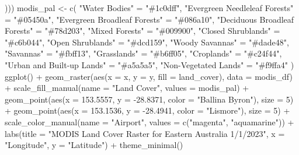 \documentclass[
  12pt,
  letterpaper,
  DIV=11,
  numbers=noendperiod]{scrartcl}
\newenvironment{Shaded}{\begin{snugshade}}{\end{snugshade}}
\newcommand{\AttributeTok}[1]{\textcolor[rgb]{0.40,0.45,0.13}{#1}}
\newcommand{\DecValTok}[1]{\textcolor[rgb]{0.68,0.00,0.00}{#1}}
\newcommand{\FloatTok}[1]{\textcolor[rgb]{0.68,0.00,0.00}{#1}}
\newcommand{\FunctionTok}[1]{\textcolor[rgb]{0.28,0.35,0.67}{#1}}
\newcommand{\NormalTok}[1]{\textcolor[rgb]{0.00,0.23,0.31}{#1}}
\newcommand{\OtherTok}[1]{\textcolor[rgb]{0.00,0.23,0.31}{#1}}
\newcommand{\SpecialCharTok}[1]{\textcolor[rgb]{0.37,0.37,0.37}{#1}}
\newcommand{\StringTok}[1]{\textcolor[rgb]{0.13,0.47,0.30}{#1}}
\begin{document}
\begin{Shaded}
\begin{Highlighting}[]
\NormalTok{  )))}
\NormalTok{modis\_pal }\OtherTok{\textless{}{-}} \FunctionTok{c}\NormalTok{(}
  \StringTok{"Water Bodies"} \OtherTok{=} \StringTok{"\#1c0dff"}\NormalTok{,}
  \StringTok{"Evergreen Needleleaf Forests"} \OtherTok{=} \StringTok{"\#05450a"}\NormalTok{,}
  \StringTok{"Evergreen Broadleaf Forests"} \OtherTok{=} \StringTok{"\#086a10"}\NormalTok{,}
  \StringTok{"Deciduous Broadleaf Forests"} \OtherTok{=} \StringTok{"\#78d203"}\NormalTok{,}
  \StringTok{"Mixed Forests"} \OtherTok{=} \StringTok{"\#009900"}\NormalTok{,}
  \StringTok{"Closed Shrublands"} \OtherTok{=} \StringTok{"\#c6b044"}\NormalTok{,}
  \StringTok{"Open Shrublands"} \OtherTok{=} \StringTok{"\#dcd159"}\NormalTok{,}
  \StringTok{"Woody Savannas"} \OtherTok{=} \StringTok{"\#dade48"}\NormalTok{,}
  \StringTok{"Savannas"} \OtherTok{=} \StringTok{"\#fbff13"}\NormalTok{,}
  \StringTok{"Grasslands"} \OtherTok{=} \StringTok{"\#b6ff05"}\NormalTok{,}
  \StringTok{"Croplands"} \OtherTok{=} \StringTok{"\#c24f44"}\NormalTok{,}
  \StringTok{"Urban and Built{-}up Lands"} \OtherTok{=} \StringTok{"\#a5a5a5"}\NormalTok{,}
  \StringTok{"Non{-}Vegetated Lands"} \OtherTok{=} \StringTok{"\#f9ffa4"}
\NormalTok{)}
\FunctionTok{ggplot}\NormalTok{() }\SpecialCharTok{+}
  \FunctionTok{geom\_raster}\NormalTok{(}\FunctionTok{aes}\NormalTok{(}\AttributeTok{x =}\NormalTok{ x, }\AttributeTok{y =}\NormalTok{ y, }\AttributeTok{fill =}\NormalTok{ land\_cover),}
              \AttributeTok{data =}\NormalTok{ modis\_df) }\SpecialCharTok{+}
  \FunctionTok{scale\_fill\_manual}\NormalTok{(}\AttributeTok{name =} \StringTok{"Land Cover"}\NormalTok{, }\AttributeTok{values =}\NormalTok{ modis\_pal) }\SpecialCharTok{+}
  \FunctionTok{geom\_point}\NormalTok{(}\FunctionTok{aes}\NormalTok{(}\AttributeTok{x =} \FloatTok{153.5557}\NormalTok{, }\AttributeTok{y =} \SpecialCharTok{{-}}\FloatTok{28.8371}\NormalTok{, }\AttributeTok{color =} \StringTok{"Ballina Byron"}\NormalTok{), }\AttributeTok{size =} \DecValTok{5}\NormalTok{) }\SpecialCharTok{+}
  \FunctionTok{geom\_point}\NormalTok{(}\FunctionTok{aes}\NormalTok{(}\AttributeTok{x =} \FloatTok{153.1536}\NormalTok{, }\AttributeTok{y =} \SpecialCharTok{{-}}\FloatTok{28.4941}\NormalTok{, }\AttributeTok{color =} \StringTok{"Lismore"}\NormalTok{), }\AttributeTok{size =} \DecValTok{5}\NormalTok{) }\SpecialCharTok{+}
  \FunctionTok{scale\_color\_manual}\NormalTok{(}\AttributeTok{name =} \StringTok{"Airport"}\NormalTok{, }\AttributeTok{values =} \FunctionTok{c}\NormalTok{(}\StringTok{"magenta"}\NormalTok{, }\StringTok{"aquamarine"}\NormalTok{)) }\SpecialCharTok{+}
  \FunctionTok{labs}\NormalTok{(}\AttributeTok{title =} \StringTok{"MODIS Land Cover Raster for Eastern Australia 1/1/2023"}\NormalTok{,}
       \AttributeTok{x =} \StringTok{"Longitude"}\NormalTok{, }\AttributeTok{y =} \StringTok{"Latitude"}\NormalTok{) }\SpecialCharTok{+}
  \FunctionTok{theme\_minimal}\NormalTok{()}
\end{Highlighting}
\end{Shaded}
\end{document}
